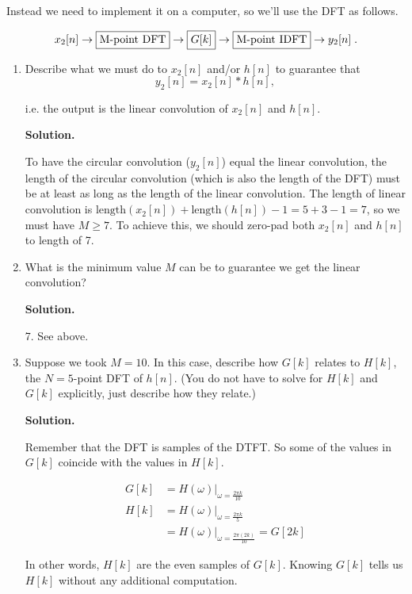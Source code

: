\documentclass[]{siamltex}
\begin{document}
\begin{enumerate}
\begin{enumerate}
Instead we need to implement it on a computer, so we'll use the DFT as follows.

$$x_2[n] \rightarrow  \fbox{M-point DFT}  \rightarrow \fbox{$G[k]$}\rightarrow  \fbox{M-point IDFT}  \rightarrow y_2[n]\;.$$

\begin{enumerate} 
\item Describe what we must do to $x_2[n]$ and/or $h[n]$ to guarantee that $$y_2[n] = x_2[n]*h[n],$$ 

i.e. the output is the linear convolution of $x_2[n]$ and  $h[n]$.

\textbf{Solution.} 


To have the circular convolution ($y_2[n]$) equal the linear convolution, the length of the circular convolution (which is also the length of the DFT) must be at least as long as the length of the linear convolution. The length of linear convolution is $\text{length}(x_2[n]) + \text{length}(h[n]) - 1 = 5 + 3 -1 = 7$, so we must have $M \geq 7$. To achieve this, we should zero-pad both $x_2[n]$ and $h[n]$ to length of 7.


\item What is the minimum value $M$ can be to guarantee we get the linear convolution?


\textbf{Solution.} 

7. See above.


\item Suppose we took $M=10$. In this case, describe how $G[k]$ relates to $H[k]$, the $N=5$-point DFT of $h[n]$. (You do not have to solve for $H[k]$ and $G[k]$ explicitly, just describe how they relate.)


\textbf{Solution.} 

Remember that the DFT is samples of the DTFT. So some of the values in $G[k]$ coincide with the values in $H[k]$.

\begin{align*}
G[k] & = H(\omega)\big|_{\omega = \frac{2 \pi k}{10}} \\
H[k] & = H(\omega)\big|_{\omega = \frac{2 \pi k}{5}} \\
& = H(\omega)\big|_{\omega = \frac{2 \pi (2k)}{10}} = G[2k]
\end{align*}

In other words, $H[k]$ are the even samples of $G[k]$. Knowing $G[k]$ tells us $H[k]$ without any additional computation.

\end{enumerate}
\end{enumerate}




\end{enumerate}
\end{document}
